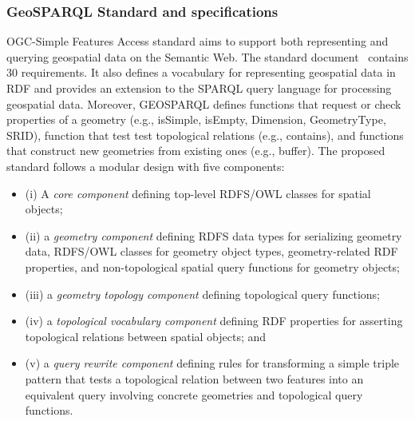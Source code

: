 \begin{table}[!htbp]
\end{table}

\subsubsection{GeoSPARQL Standard and specifications}
\label{sec:specgeosparql}

OGC-Simple Features Access standard aims to support both representing and querying geospatial data on the Semantic Web. The standard document~\cite{ogc2012} contains 30 requirements. It also defines a vocabulary for representing geospatial data in RDF and provides an extension to the SPARQL query language for processing geospatial data. 
Moreover, GEOSPARQL defines functions that request or check properties of a geometry (e.g., isSimple, isEmpty, Dimension, GeometryType, SRID), function that test test topological relations (e.g., contains),
and functions that construct new geometries from existing ones (e.g., buffer). 
 The proposed standard follows a modular design with five components: 
\begin{itemize}
\item (i) A \textit{core component} defining top-level RDFS/OWL classes for spatial objects; 
\item (ii) a \textit{geometry component} defining RDFS data types for serializing geometry data, RDFS/OWL classes for geometry object types, geometry-related RDF properties, and non-topological spatial query functions for geometry objects; 
\item (iii) a \textit{geometry topology component} defining topological query functions; 
\item (iv) a \textit{topological vocabulary component} defining RDF properties for asserting topological relations between spatial objects; and 
\item (v) a \textit{query rewrite component} defining rules for transforming a simple triple pattern that tests a topological relation between two features into an equivalent query involving concrete geometries and topological query functions.
\end{itemize}

